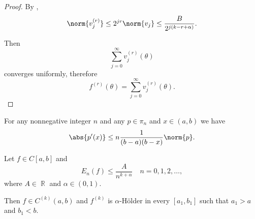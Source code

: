 \begin{proof}
  By ,
  \begin{equation*}
    \norm{v_j^{(r)}} \leq 2^{jr} \norm{v_j} \leq \frac B {2^{j(k - r + \alpha)}}.
  \end{equation*}

  Then
  \begin{equation*}
    \sum_{j=0}^\infty v_j^{(r)} (\theta)
  \end{equation*}
  converges uniformly, therefore
  \begin{equation*}
    f^{(r)}(\theta) = \sum_{j=0}^\infty v_j^{(r)} (\theta).
  \end{equation*}
\end{proof}

\begin{theorem}\label{thm:bernsteins_algebraic_inequality}
  For any nonnegative integer \( n \) and any \( p \in \pi_n \) and \( x \in (a, b) \) we have
  \begin{equation*}
    \abs{p'(x)} \leq n \frac 1 {(b - a)(b - x)} \norm{p}.
  \end{equation*}
\end{theorem}

\begin{theorem}\label{thm:bernsteins_algebraic_theorem}
  Let \( f \in C[a, b] \) and
  \begin{equation*}
    E_n(f) \leq \frac A {n^{k+\alpha}} \quad n = 0, 1, 2, \ldots,
  \end{equation*}
  where \( A \in \BbbR \) and \( \alpha \in (0, 1) \).

  Then \( f \in C^{(k)}(a, b) \) and \( f^{(k)} \) is \( \alpha \)-H\"older in every \( [a_1, b_1] \) such that \( a_1 > a \) and \( b_1 < b \).
\end{theorem}
